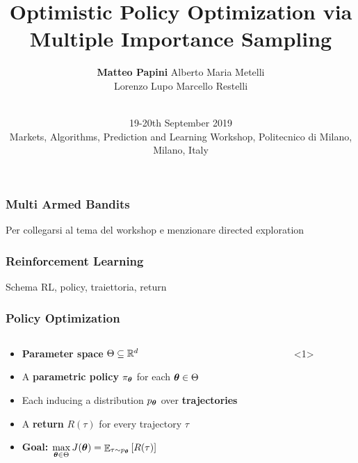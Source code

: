 \documentclass[aspectratio=169, table]{beamer}
\title{Optimistic Policy Optimization via Multiple Importance Sampling}
\date[AAA]{\vspace{0.2cm} \\ \small{ 19-20th September 2019 \\ Markets, Algorithms, Prediction and Learning Workshop, Politecnico di Milano, Milano, Italy}}
\author[M. Papini]{\textbf{Matteo Papini} \quad Alberto Maria Metelli\\
						{Lorenzo Lupo \quad Marcello Restelli}}
\newcommand{\enb}[1]{\textcolor{poliblue1}{\textbf{#1}}}
\begin{document}

\begin{frame}[noframenumbering]
\titlepage
\end{frame}

\begin{frame}
\frametitle{Multi Armed Bandits} 
Per collegarsi al tema del workshop e menzionare directed exploration
\end{frame}

\begin{frame}
\frametitle{Reinforcement Learning} 
Schema RL, policy, traiettoria, return
\end{frame}

\begin{frame}
\frametitle{Policy Optimization} 
\begin{columns}
\begin{column}{.65\textwidth}
\begin{overlayarea}{\textwidth}{\textheight}
\begin{itemize}
	\setlength{\itemsep}{20pt}
	\item \enb{Parameter space} $\Theta \subseteq \mathbb{R}^d$
	\item<2-> A \enb{parametric policy} $\pi_{\boldsymbol{\theta}}$ for each $\boldsymbol{\theta}\in\Theta$
	\item<3-> Each inducing a distribution $p_{\boldsymbol{\theta}}$ over \enb{trajectories}
	\item<4-> A \enb{return} $R(\tau)$ for every trajectory $\tau$
	\item<5-> {\enb{Goal:} $\max\limits_{\boldsymbol{\theta}\in\Theta} J(\boldsymbol{\theta}) = \mathop{\mathbb{E}}_{\tau\sim p_{\boldsymbol{\theta}}}\left[R(\tau)\right]$}
\end{itemize}
\end{overlayarea}
\end{column}
\begin{column}{.35\textwidth}
\begin{overlayarea}{\textwidth}{\textheight}

\end{overlayarea}
\end{column}
\end{columns}
\end{frame}
\end{document}
